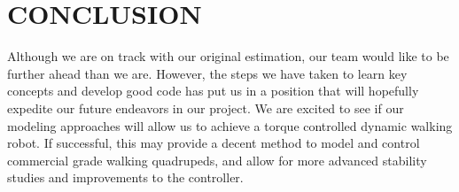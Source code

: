 \section{CONCLUSION}
Although we are on track with our original estimation, our team would like to be further ahead than we are. However, the steps we have taken to learn key concepts and develop good code has put us in a position that will hopefully expedite our future endeavors in our project. We are excited to see if our modeling approaches will allow us to achieve a torque controlled dynamic walking robot. If successful, this may provide a decent method to model and control commercial grade walking quadrupeds, and allow for more advanced stability studies and improvements to the controller.